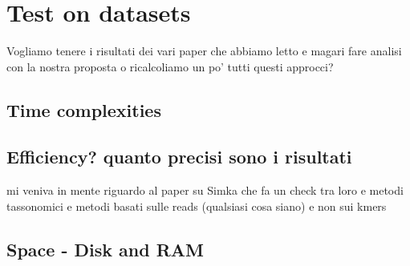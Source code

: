 \section{Test on datasets}
Vogliamo tenere i risultati dei vari paper che abbiamo letto e magari fare analisi con la nostra proposta o ricalcoliamo un po' tutti questi approcci?
\subsection{Time complexities}
\subsection{Efficiency? quanto precisi sono i risultati}
mi veniva in mente riguardo al paper su Simka che fa un check tra loro e metodi tassonomici e metodi basati sulle reads (qualsiasi cosa siano) e non sui kmers
\subsection{Space - Disk and RAM}
